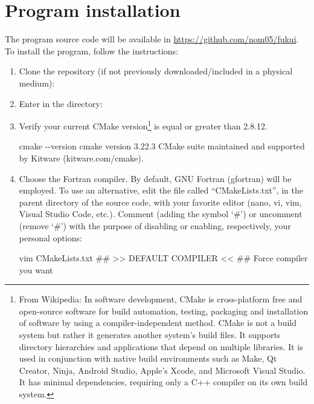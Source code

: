 \documentclass[a4paper,11pt,openany]{memoir}
\begin{document}
\chapter{Program installation}


The program source code will be available in \url{https://github.com/nom05/fukui}. To install the program, follow the instructions:
\begin{enumerate}
	\item Clone the repository (if not previously downloaded/included in a physical medium):
	\item Enter in the directory:
	\item Verify your current CMake version\footnote{From Wikipedia: In software development, CMake is cross-platform free and open-source software for build automation, testing, packaging and installation of software by using a compiler-independent method. CMake is not a build system but rather it generates another system's build files. It supports directory hierarchies and applications that depend on multiple libraries. It is used in conjunction with native build environments such as Make, Qt Creator, Ninja, Android Studio, Apple's Xcode, and Microsoft Visual Studio. It has minimal dependencies, requiring only a C++ compiler on its own build system.} is equal or greater than 2.8.12.
		\begin{consola}{cmake -{}-version}
cmake version 3.22.3
CMake suite maintained and supported by Kitware (kitware.com/cmake).
\end{consola}
	\item Choose the Fortran compiler. By default, GNU Fortran (gfortran) will be employed. To use an alternative, edit the file called ``CMakeLists.txt'', in the parent directory of the source code, with your favorite editor (nano, vi, vim, Visual Studio Code, etc.). Comment (adding the symbol `\#') or uncomment (remove `\#') with the purpose of disabling or enabling, respectively, your personal options:
		\begin{consola}{vim CMakeLists.txt}
## >> DEFAULT COMPILER << ## Force compiler you want

\end{consola}
\end{enumerate}
\end{document}
